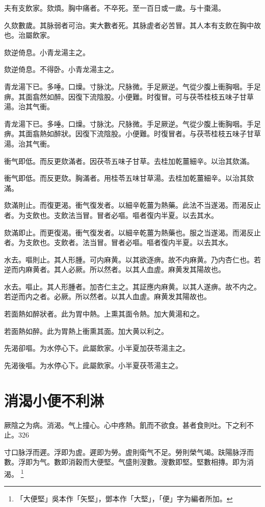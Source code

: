 夫有支飲家。欬煩。胸中痛者。不卒死。至一百日{\khaaitp 或}一歲。与十棗湯。

久欬數歲。其脉弱者可治。実大數者死。其脉虗者必苦冒。其人本有支飲在胸中故也。治屬飲家。

欬逆倚息。小青龙湯主之。{\wuben}

欬逆倚息。不得卧。小青龙湯主之。{\dengben}

青龙湯下已。多唾。口燥。寸脉沈。尺脉微。手足厥逆。气從少腹上衝胸咽。手足痹。其面翕然如醉。因復下流陰股。小便難。时復冒。可与茯苓桂枝五味子甘草湯。治其气衝。{\wuben}

青龙湯下已。多唾。口燥。寸脉沈。尺脉微。手足厥逆。气從少腹上衝胸咽。手足痹。其面翕熱如醉狀。因復下流陰股。小便難。时復冒者。与茯苓桂枝五味子甘草湯。治其气衝。{\dengben}

衝气即低。而反更欬滿者。因茯苓五味子甘草。去桂加乾薑細辛。以治其欬滿。{\wuben}

衝气即低。而反更欬。胸滿者。用桂苓五味甘草湯。去桂加乾薑細辛。以治其欬滿。{\dengben}

欬滿則止。而復更渴。衝气復发者。以細辛乾薑为熱藥。此法不当遂渴。而渴反止者。为支飲也。支飲法当冒。冒者必嘔。嘔者復内半夏。以去其水。{\wuben}

欬滿即止。而更復渴。衝气復发者。以細辛乾薑为熱藥也。服之当遂渴。而渴反止者。为支飲也。支飲者。法当冒。冒者必嘔。嘔者復内半夏。以去其水。{\dengben}

水去。嘔則止。其人形腫。可内麻黄。以其欲逐痹。故不内麻黄。乃内杏仁也。若逆而内麻黄者。其人必厥。所以然者。以其人血虗。麻黄发其陽故也。{\wuben}

水去。嘔止。其人形腫者。加杏仁主之。其証應内麻黄。以其人遂痹。故不内之。若逆而内之者。必厥。所以然者。以其人血虗。麻黄发其陽故也。{\dengben}

若面熱如醉狀者。此为胃中熱。上熏其面令熱。加大黄湯和之。{\wuben}

若面熱如醉。此为胃熱上衝熏其面。加大黄以利之。{\dengben}

先渴卻嘔。为水停心下。此屬飲家。小半夏加茯苓湯主之。{\wuben}

先渴後嘔。为水停心下。此屬飲家。小半夏茯苓湯主之。{\dengben}

\chapter{消渴小便{\khaaitp 不}利淋}

厥陰之为病。消渴。气上撞{\khaaitp 心}。心中疼熱。飢而不欲食。{\khaaitp 甚者}食則吐。下之利不止。326

寸口脉浮而遲。浮即为虗。遲即为勞。虗則衛气不足。勞則榮气竭。趺陽脉浮而數。浮即为气。數即消穀而大{\khaaitp 便}堅。气盛則溲數。溲數即堅。堅數相摶。即为消渴。
	\footnote{
		「大便堅」吳本作「矢堅」，鄧本作「大堅」，「便」字为編者所加。
	}

